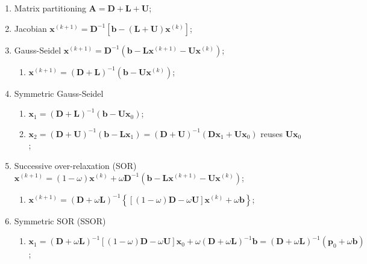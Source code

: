 \begin{enumerate}[label=$\blacksquare$]
\item Matrix partitioning ${\bm{A}} = {\bm{D}} + {\bm{L}} + {\bm{U}}$;
\item Jacobian ${{\bm{x}}^{\left( {k + 1} \right)}} = {{\bm{D}}^{ - 1}}\left[ {{\bm{b}} - \left( {\bm{L}} + {\bm{U}} \right) {{\bm{x}}^{\left( k \right)}}} \right]$;
\item Gauss-Seidel ${{\bm{x}}^{\left( {k + 1} \right)}} = {{\bm{D}}^{ - 1}}\left( {{\bm{b}} - {\bm{L}}{{\bm{x}}^{\left( {k + 1} \right)}} - {\bm{U}}{{\bm{x}}^{\left( k \right)}}} \right)$;
  \begin{enumerate}[label=$\bullet$]
  \item ${{\bm{x}}^{\left( {k + 1} \right)}} = {\left( {{\bm{D}} + {\bm{L}}} \right)^{ - 1}}\left( { {\bm{b}} - {\bm{U}}  {{\bm{x}}^{\left( k \right)}}} \right)$;
  \end{enumerate}
\item Symmetric Gauss-Seidel
  \begin{enumerate}[label=$\bullet$]
  \item ${{\bm{x}}_1} = {\left( {{\bm{D}} + {\bm{L}}} \right)^{ - 1}}\left( { {\bm{b}} - {\bm{U}}  {{\bm{x}}_0}} \right)$;
  \item ${{\bm{x}}_2} = {\left( {{\bm{D}} + {\bm{U}}} \right)^{ - 1}}\left( { {\bm{b}} - {\bm{L}}  {{\bm{x}}_1}} \right)  = {\left( {{\bm{D}} + {\bm{U}}} \right)^{ - 1}}\left( {{\bm{D}}{{\bm{x}}_1} + {\bm{U}}{{\bm{x}}_0}} \right)$ reuses ${\bm{U}}{{\bm{x}}_0}$;
  \end{enumerate}
\item Successive over-relaxation (SOR) ${{\bm{x}}^{\left( {k + 1} \right)}} = \left( {1 - \omega } \right){{\bm{x}}^{\left( k \right)}} + \omega {{\bm{D}}^{ - 1}}\left( {{\bm{b}} - {\bm{L}}{{\bm{x}}^{\left( {k + 1} \right)}} - {\bm{U}}{{\bm{x}}^{\left( k \right)}}} \right)$;
  \begin{enumerate}[label=$\bullet$]
  \item ${{\bm{x}}^{\left( {k + 1} \right)}} = {\left( {{\bm{D}} + \omega {\bm{L}}} \right)^{ - 1}} \left\{ \left[ {\left( {1 - \omega } \right){\bm{D}} - \omega {\bm{U}}} \right]{{\bm{x}}^{\left( k \right)}} + \omega {\bm{b}} \right\}$;
  \end{enumerate}
\item Symmetric SOR (SSOR)
  \begin{enumerate}[label=$\bullet$]
  \item ${{\bm{x}}_1} = {\left( {{\bm{D}} + \omega {\bm{L}}} \right)^{ - 1}}\left[ {\left( {1 - \omega } \right){\bm{D}} - \omega {\bm{U}}} \right]{{\bm{x}}_0} + \omega {\left( {{\bm{D}} + \omega {\bm{L}}} \right)^{ - 1}}{\bm{b}} = {\left( {{\bm{D}} + \omega {\bm{L}}} \right)^{ - 1}} \left( {\bm{p}}_0 + \omega {\bm{b}} \right)$;

\end{enumerate}
\end{enumerate}
